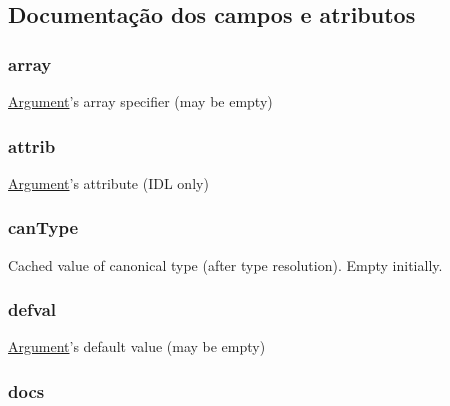 \subsection{Documentação dos campos e atributos}
\hypertarget{struct_argument_a86c3f26165f8d189358a5496e71a929d}{
\subsubsection[{array}]{ array}}\label{struct_argument_a86c3f26165f8d189358a5496e71a929d}
\hyperlink{struct_argument}{Argument}'s array specifier (may be empty) \hypertarget{struct_argument_a568fa5bb9141551201cb4822cc8ae7b7}{
\subsubsection[{attrib}]{ attrib}}\label{struct_argument_a568fa5bb9141551201cb4822cc8ae7b7}
\hyperlink{struct_argument}{Argument}'s attribute (I\-D\-L only) \hypertarget{struct_argument_a74d54ffc237b2b850e50345e7c8fa3a4}{
\subsubsection[{can\-Type}]{ can\-Type}}\label{struct_argument_a74d54ffc237b2b850e50345e7c8fa3a4}
Cached value of canonical type (after type resolution). Empty initially. \hypertarget{struct_argument_a838035f10d60ad8fc6923ab1bb3f3e51}{
\subsubsection[{defval}]{ defval}}\label{struct_argument_a838035f10d60ad8fc6923ab1bb3f3e51}
\hyperlink{struct_argument}{Argument}'s default value (may be empty) \hypertarget{struct_argument_a19e06f4d6586ea625f163986a2604c36}{
\subsubsection[{docs}]{ docs}}\label{struct_argument_a19e06f4d6586ea625f163986a2604c36}

